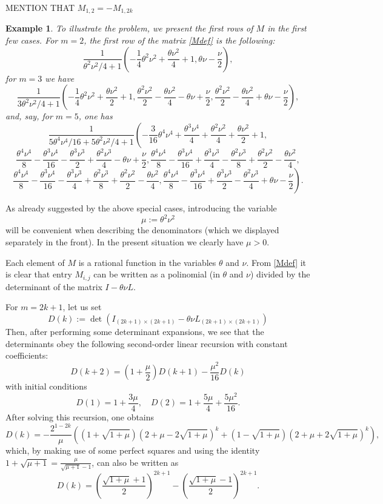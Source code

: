 \documentclass[a4paper]{article}
\newtheorem{example}{Example}
\newcommand{\te}{\theta}
\begin{document}
MENTION THAT $M_{1,2}=-M_{1,2k}$\\




\begin{example}\label{example1} To illustrate the problem, we present the first rows of $M$ in the first few cases. For $m=2$, the first row of the matrix \eqref{Mdef} is the following:
\[\frac{1}{{\theta ^2 \nu ^2}/{4}+1}\left(-\frac{1}{4} \theta ^2 \nu ^2+\frac{\theta  \nu ^2}{4}+1,\theta  \nu -\frac{\nu }{2}\right),\]
for $m=3$ we have
\[
\frac{1}{{3 \theta ^2 \nu ^2}/{4}+1}\left(-\frac{1}{4} \theta ^2 \nu ^2+\frac{\theta  \nu ^2}{2}+1,\frac{\theta ^2 \nu ^2}{2}-\frac{\theta  \nu ^2}{4}-\theta  \nu +\frac{\nu
   }{2},\frac{\theta ^2 \nu ^2}{2}-\frac{\theta  \nu ^2}{4}+\theta  \nu -\frac{\nu }{2}\right),
\]
and, say, for $m=5$, one has
\[
\frac{1}{{5 \theta ^4 \nu ^4}/{16}+{5 \theta ^2 \nu ^2}/{4}+1}\left(-\frac{3}{16} \theta ^4 \nu ^4+\frac{\theta ^3 \nu^4}{4}+\frac{\theta ^2 \nu ^2}{4}+\frac{\theta  \nu ^2}{2}+1,\right.
\]
\[  
\frac{\theta ^4 \nu^4}{8}-\frac{\theta ^3 \nu ^4}{16}-\frac{\theta ^3 \nu ^3}{2}+\frac{\theta ^2 \nu ^3}{4}-\theta  \nu +\frac{\nu }{2},\frac{\theta ^4 \nu^4}{8}-\frac{\theta ^3 \nu ^4}{16}+\frac{\theta ^3 \nu ^3}{4}-\frac{\theta ^2 \nu ^3}{8}+\frac{\theta ^2 \nu ^2}{2}-\frac{\theta  \nu^2}{4},
\]
\[
\left.
\frac{\theta ^4 \nu ^4}{8}-\frac{\theta ^3 \nu ^4}{16}-\frac{\theta ^3 \nu ^3}{4}+\frac{\theta ^2 \nu ^3}{8}+\frac{\theta ^2 \nu^2}{2}-\frac{\theta  \nu ^2}{4},\frac{\theta ^4 \nu ^4}{8}-\frac{\theta ^3 \nu ^4}{16}+\frac{\theta ^3 \nu ^3}{2}-\frac{\theta ^2 \nu ^3}{4}+\theta 
   \nu -\frac{\nu }{2}\right).
\]
\end{example}
As already suggested by the above special cases, introducing the variable
\[
\mu:=\te^2\nu^2
\]
will be convenient when describing the denominators (which we displayed separately in the front).
In the present situation we clearly have $\mu>0$.

Each element of $M$ is a rational function in the variables $\te$ and $\nu$. From \eqref{Mdef} it is clear that  entry $M_{i,j}$ can be written as a polinomial (in $\te$ and $\nu$) divided by the determinant of the matrix 
$I-\te\nu L$. 

For $m=2k+1$, let us set
\[
D(k):=\det\left(I_{(2k+1)\times(2k+1)}-\te\nu L_{(2k+1)\times(2k+1)}\right)
\]
Then, after performing some determinant expansions, we see that the determinants obey the following second-order linear recursion with constant coefficients:
\[
D(k+2)=\left(1+\frac{\mu}{2}\right)D(k+1)-\frac{\mu^2}{16}D(k)
\]
with initial conditions
\[
D(1)=1+\frac{3\mu}{4}, \quad D(2)=1+\frac{5\mu}{4}+\frac{5\mu^2}{16}.
\]
After solving this recursion, one obtains
\[
D(k)=-\frac{2^{1-2 k}}{\mu } \left(\left(1+\sqrt{1+\mu }\right) \left(2+\mu -2 \sqrt{1+\mu }\right)^k+\left(1-\sqrt{1+\mu }\right) \left(2+\mu +2 \sqrt{1+\mu}\right)^k\right),
\]
which, by making use of some perfect squares and using the identity $1+\sqrt{\mu +1}=\frac{\mu }{\sqrt{\mu +1}-1}$, can also be written as
\begin{equation}\label{expldet}
D(k)=\left(\frac{\sqrt{1+\mu}+1}{2}\right)^{2 k+1}- \left(\frac{\sqrt{1+\mu}-1}{2}\right)^{2 k+1}.
\end{equation}
\end{document}
